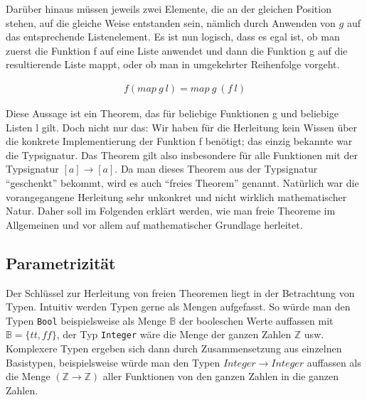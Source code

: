 Darüber hinaus müssen jeweils zwei Elemente, die an der gleichen Position stehen, auf die gleiche Weise entstanden sein, nämlich
durch Anwenden von $g$ auf das entsprechende Listenelement.
Es ist nun logisch, dass es egal ist, ob man zuerst die Funktion f auf eine Liste anwendet und dann die Funktion g auf die
resultierende Liste mappt, oder ob man in umgekehrter Reihenfolge vorgeht.

\begin{align}
f (map\ g\ l) = map\ g\ (f\ l)
\end{align}

Diese Aussage ist ein Theorem, das für beliebige Funktionen g und beliebige Listen l gilt. Doch nicht nur das: Wir haben für
die Herleitung kein Wissen über die konkrete Implementierung der Funktion f benötigt; das einzig bekannte war die Typsignatur.
Das Theorem gilt also insbesondere für alle Funktionen mit der Typsignatur $[a] \rightarrow [a]$. Da man dieses Theorem
aus der Typsignatur ``geschenkt'' bekommt, wird es auch ``freies Theorem'' genannt.
Natürlich war die vorangegangene Herleitung sehr unkonkret und nicht wirklich mathematischer Natur. Daher soll im Folgenden
erklärt werden, wie man freie Theoreme im Allgemeinen und vor allem auf mathematischer Grundlage herleitet.


\subsection{Parametrizität}

\label{sec:free-theorems-param}

Der Schlüssel zur Herleitung von freien Theoremen liegt in der Betrachtung von Typen.
Intuitiv werden Typen gerne als Mengen aufgefasst. So würde man den Typen \texttt{Bool} beispielsweise als Menge $\mathbb{B}$
der booleschen Werte auffassen mit $\mathbb{B} = \{ tt, ff \}$, der Typ \texttt{Integer} wäre die Menge der ganzen Zahlen
$\mathbb{Z}$ usw. Komplexere Typen ergeben sich dann durch Zusammensetzung aus einzelnen Basistypen, beispielsweise
würde man den Typen \texttt{$Integer \rightarrow Integer$} auffassen als die Menge $(\mathbb{Z} \rightarrow \mathbb{Z})$ aller Funktionen von den ganzen Zahlen in die ganzen Zahlen.

